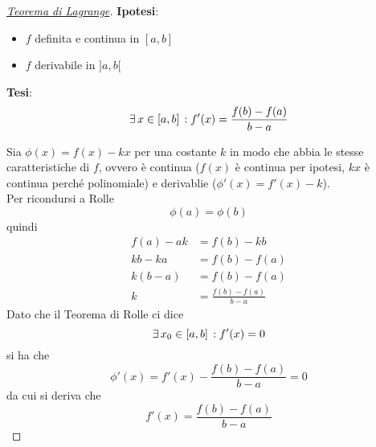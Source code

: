 \begin{proof}[\protect\hyperlink{teor:lagrange}{Teorema di Lagrange}]
  \textbf{Ipotesi}:
  \begin{itemize}
    \item $f$ definita e continua in $[a,b]$
    \item $f$ derivabile in $]a,b[$
  \end{itemize}
  \textbf{Tesi}:
  \begin{equation*}
    \exists\,x\in[a,b]\,: f'(x) = \frac{f(b)-f(a)}{b-a}
  \end{equation*}
  \divisor

  Sia $\phi(x) = f(x)-kx$ per una costante $k$ in modo che abbia le stesse caratteristiche di $f$,
  ovvero è continua ($f(x)$ è continua per ipotesi, $kx$ è continua perché polinomiale) e 
  derivablie ($\phi'(x) = f'(x)-k$).\\
  Per ricondursi a Rolle
  \begin{equation*}
    \phi(a) = \phi(b)
  \end{equation*}
  quindi
  \begin{align*}
    f(a)-ak &= f(b)-kb\\
    kb-ka &= f(b)-f(a)\\
    k(b-a) &= f(b)-f(a)\\
    k &= \frac{f(b)-f(a)}{b-a}
  \end{align*}
  Dato che il Teorema di Rolle ci dice
  \begin{equation*}
    \exists\,x_0\in[a,b]\,: f'(x)=0
  \end{equation*}
  si ha che
  \begin{equation*}
    \phi'(x) = f'(x)-\frac{f(b)-f(a)}{b-a} = 0
  \end{equation*}
  da cui si deriva che
  \begin{equation*}
    f'(x) = \frac{f(b)-f(a)}{b-a}
  \end{equation*}
\end{proof}

